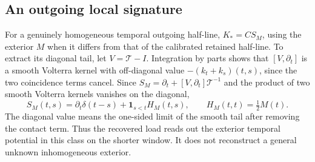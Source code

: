 \subsection{An outgoing local signature}
For a genuinely homogeneous temporal outgoing half-line, \(K_*=CS_M\), using the exterior \(M\) when it differs from that of the calibrated retained half-line. To extract its diagonal tail, let \(V=\mathcal T-I\). Integration by parts shows that \([V,\partial_t]\) is a smooth Volterra kernel with off-diagonal value \(-(k_t+k_s)(t,s)\), since the two coincidence terms cancel. Since \(S_M=\partial_t+[V,\partial_t]\mathcal T^{-1}\) and the product of two smooth Volterra kernels vanishes on the diagonal, 
\begin{equation}
 S_M(t,s)=\partial_t\delta(t-s)+{\boldsymbol1}_{s<t}H_M(t,s),
      \qquad H_M(t,t)=\tfrac12 M(t).
 \label{eq:diagTail}
\end{equation}
The diagonal value means the one-sided limit of the smooth tail after removing the contact term. Thus the recovered load reads out the exterior temporal potential in this class on the shorter window. It does not reconstruct a general unknown inhomogeneous exterior.

